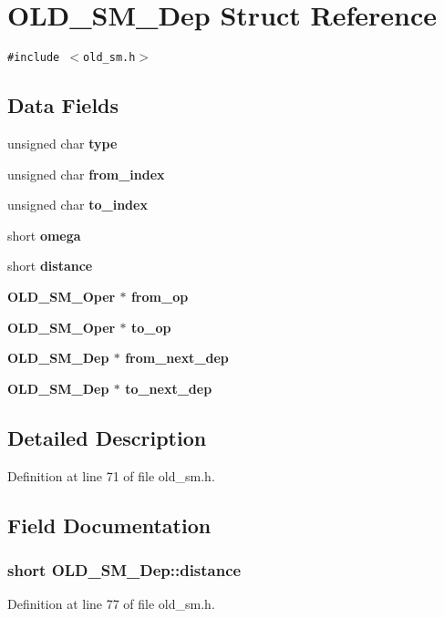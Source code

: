 \section{OLD\_\-SM\_\-Dep Struct Reference}
\label{structOLD__SM__Dep}
{\tt \#include $<$old\_\-sm.h$>$}

\subsection*{Data Fields}
\begin{CompactItemize}
\item 
unsigned char \bf{type}
\item 
unsigned char \bf{from\_\-index}
\item 
unsigned char \bf{to\_\-index}
\item 
short \bf{omega}
\item 
short \bf{distance}
\item 
\bf{OLD\_\-SM\_\-Oper} $\ast$ \bf{from\_\-op}
\item 
\bf{OLD\_\-SM\_\-Oper} $\ast$ \bf{to\_\-op}
\item 
\bf{OLD\_\-SM\_\-Dep} $\ast$ \bf{from\_\-next\_\-dep}
\item 
\bf{OLD\_\-SM\_\-Dep} $\ast$ \bf{to\_\-next\_\-dep}
\end{CompactItemize}


\subsection{Detailed Description}




Definition at line 71 of file old\_\-sm.h.

\subsection{Field Documentation}
\subsubsection{\setlength{\rightskip}{0pt plus 5cm}short \bf{OLD\_\-SM\_\-Dep::distance}}\label{structOLD__SM__Dep_bbc73112b9ac3c9d8b4ff184b3edffc1}




Definition at line 77 of file old\_\-sm.h.

